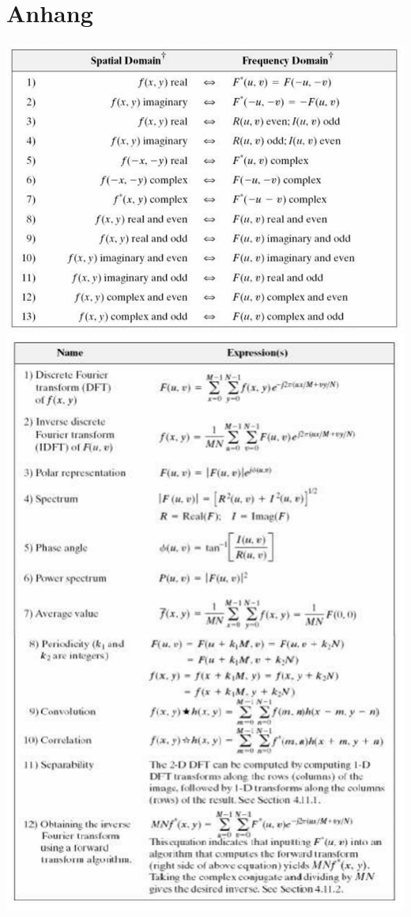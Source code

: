 \section{Anhang}
\begin{center}\label{table:ft_symmetrie}
	\includegraphics[width=\columnwidth]{Images/symmetry_ft}
	\includegraphics[width=\columnwidth]{Images/dft}
\end{center}
